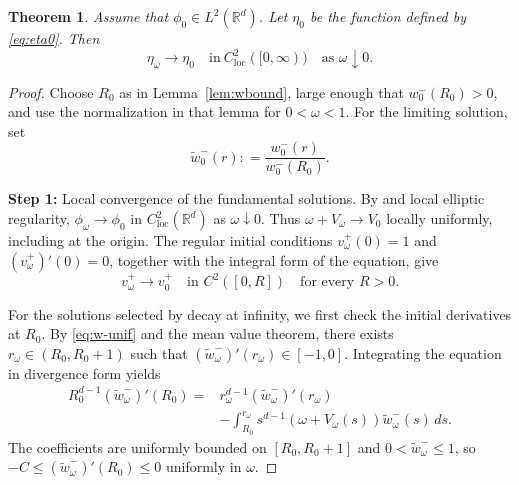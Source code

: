 \documentclass[12pt, a4paper, reqno]{amsart}
\numberwithin{equation}{section}
\newtheorem{theorem}{Theorem}[section]
\theoremstyle{definition}
\theoremstyle{remark}
\newcommand{\R}{\mathbb R}
\newcommand{\ce}{\mathrel{\mathop:}=}
\begin{document}
\begin{theorem}\label{thm:etalim}
Assume that $\phi_0\in L^2(\R^d)$. Let $\eta_0$ be the function
defined by \eqref{eq:eta0}. Then
\[
  \eta_\omega\to\eta_0
  \quad\text{in}~C_{\mathrm{loc}}^2([0,\infty))
  \quad\text{as }\omega\downarrow0.
\]
\end{theorem}

\begin{proof}
Choose $R_0$ as in Lemma~\ref{lem:wbound}, large enough that
$w_0^-(R_0)>0$, and use the normalization in that lemma for
$0<\omega<1$. For the limiting solution, set
\[
  \widetilde w_0^-(r)\ce \frac{w_0^-(r)}{w_0^-(R_0)}.
\]

\medskip
\noindent\textbf{Step 1:} Local convergence of the fundamental solutions.
By \cite[Theorem~1.6]{FH21} and local elliptic regularity,
$\phi_\omega\to\phi_0$ in $C_{\mathrm{loc}}^2(\R^d)$ as
$\omega\downarrow0$. Thus
$\omega+V_\omega\to V_0$ locally uniformly, including at the origin.
The regular initial conditions $v_\omega^+(0)=1$ and
$(v_\omega^+)'(0)=0$, together with the integral form of the equation,
give
\[
  v_\omega^+\to v_0^+
  \quad\text{in }C^2([0,R])\quad\text{for every }R>0.
\]

For the solutions selected by decay at infinity, we first check the
initial derivatives at $R_0$. By \eqref{eq:w-unif} and the mean value
theorem, there exists $r_\omega\in(R_0,R_0+1)$ such that
$(\widetilde w_\omega^-)'(r_\omega)\in[-1,0]$. Integrating the
equation in divergence form yields
\begin{align*}
  R_0^{d-1}(\widetilde w_\omega^-)'(R_0)
  ={}&r_\omega^{d-1}(\widetilde w_\omega^-)'(r_\omega)\\
     &-\int_{R_0}^{r_\omega}
       s^{d-1}(\omega+V_\omega(s))\widetilde w_\omega^-(s)\,ds.
\end{align*}
The coefficients are uniformly bounded on $[R_0,R_0+1]$ and
$0<\widetilde w_\omega^-\le1$, so
$-C\le(\widetilde w_\omega^-)'(R_0)\le0$ uniformly in $\omega$.


\end{proof}
\end{document}
